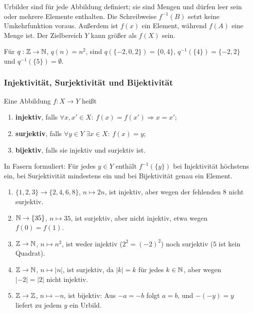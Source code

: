 \begin{bemerkung}
Urbilder sind für jede Abbildung definiert; sie sind Mengen und dürfen
leer sein oder mehrere Elemente enthalten. Die Schreibweise $f^{-1}(B)$
setzt keine Umkehrfunktion voraus. Außerdem ist $f(x)$ ein Element,
während $f(A)$ eine Menge ist. Der Zielbereich $Y$ kann größer als $f(X)$ sein.
\end{bemerkung}

\begin{beispiel}
Für $q:\mathbb{Z}\to\mathbb{N}$, $q(n)=n^2$, sind
$q(\{-2,0,2\})=\{0,4\}$,
$q^{-1}(\{4\})=\{-2,2\}$ und $q^{-1}(\{5\})=\emptyset$.
\end{beispiel}

\subsubsection*{Injektivität, Surjektivität und Bijektivität}
\begin{definition}
Eine Abbildung $f:X\to Y$ heißt
\begin{enumerate}
    \item \textbf{injektiv}, falls
    $\forall x,x'\in X:\ f(x)=f(x')\Rightarrow x=x'$;
    \item \textbf{surjektiv}, falls
    $\forall y\in Y\;\exists x\in X:\ f(x)=y$;
    \item \textbf{bijektiv}, falls sie injektiv und surjektiv ist.
\end{enumerate}
In Fasern formuliert: Für jedes $y\in Y$ enthält $f^{-1}(\{y\})$
bei Injektivität höchstens ein, bei Surjektivität mindestens ein und
bei Bijektivität genau ein Element.
\end{definition}

\begin{beispiel}
\begin{enumerate}
    \item $\{1,2,3\}\to\{2,4,6,8\}$, $n\mapsto2n$, ist injektiv,
    aber wegen der fehlenden $8$ nicht surjektiv.
    \item $\mathbb{N}\to\{35\}$, $n\mapsto35$, ist surjektiv, aber nicht
    injektiv, etwa wegen $f(0)=f(1)$.
    \item $\mathbb{Z}\to\mathbb{N}$, $n\mapsto n^2$, ist weder injektiv
    ($2^2=(-2)^2$) noch surjektiv ($5$ ist kein Quadrat).
    \item $\mathbb{Z}\to\mathbb{N}$, $n\mapsto|n|$, ist surjektiv, da $|k|=k$
    für jedes $k\in\mathbb{N}$, aber wegen $|-2|=|2|$ nicht injektiv.
    \item $\mathbb{Z}\to\mathbb{Z}$, $n\mapsto-n$, ist bijektiv:
    Aus $-a=-b$ folgt $a=b$, und $-(-y)=y$ liefert zu jedem $y$ ein Urbild.
\end{enumerate}
\end{beispiel}

